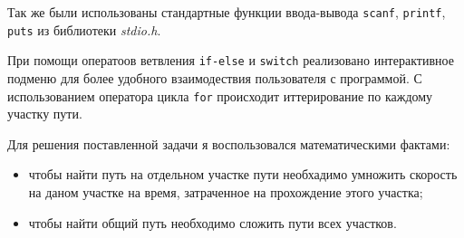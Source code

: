 \documentclass[12pt,a4paper]{report}
\begin{document}
Так же были использованы стандартные функции ввода-вывода \texttt{scanf}, \texttt{printf}, \texttt{puts} из библиотеки \textit{stdio.h}.

При помощи оператоов ветвления \texttt{if-else} и \texttt{switch} реализовано интерактивное подменю для более удобного взаимодествия пользователя с программой. С использованием оператора цикла \texttt{for} происходит иттерирование по каждому участку пути.

Для решения поставленной задачи я воспользовался математическими фактами: 
\begin{itemize}
\item чтобы найти путь на отдельном участке пути необхадимо умножить скорость на даном участке на время, затраченное на прохождение этого участка;
\item чтобы найти общий путь необходимо сложить пути всех участков.
\end{itemize}
\end{document}
